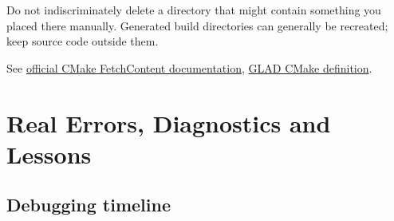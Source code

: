 \documentclass[
  10pt,
  a4paper,
]{article}
\begin{document}
Do not indiscriminately delete a directory that might contain something
you placed there manually. Generated build directories can generally be
recreated; keep source code outside them.

See
\href{https://cmake.org/cmake/help/latest/module/FetchContent.html}{official
CMake FetchContent documentation},
\href{https://github.com/Dav1dde/glad/blob/glad2/cmake/GladConfig.cmake}{GLAD
CMake definition}.

\newpage

\section{Real Errors, Diagnostics and
Lessons}\label{real-errors-diagnostics-and-lessons}

\subsection{Debugging timeline}\label{debugging-timeline}
\end{document}
